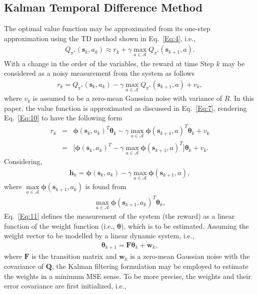 \documentclass{ieeeaccess}
\def\mA{\mathcal{A}}
\def\k{_{k}}
\def\nk{_{k+1}}
\def\bt{\bm{\theta}}
\def\h{\bm{h}}
\def\Q{\bm{Q}}
\def\F{\bm{F}}
\def\w{\bm{w}}
\def\s{\bm{s}}
\begin{document}
\subsection{Kalman Temporal Difference Method}
The optimal value function may be approximated from its one-step approximation using the TD method shown in Eq.~\eqref{Eq:4}, i.e.,
%
\begin{eqnarray}
Q_{\pi^*}(\s\k, a\k) \approx r\k +\gamma \max_{a\in \mA} Q_{\pi^*}(\s\nk, a).
\end{eqnarray}
%
With a change in the order of the variables, the reward at time Step $k$ may be considered as a noisy measurement from the system as follows
%
\begin{eqnarray}
r\k = Q_{\pi^*}(\s\k, a\k) -\gamma \max_{a\in \mA} Q_{\pi^*}(\s\nk, a) + v\k, \label{Eq:10}
\end{eqnarray}
%
where $v\k$ is assumed to be a zero-mean Gaussian noise with variance of $R$. In this paper, the value function is approximated as discussed in Eq.~\eqref{Eq:7}, rendering Eq.~\eqref{Eq:10} to have the
following form
%
\begin{eqnarray}
r\k &\!\!=\!\!& \bm{\phi}(\s\k, a\k)^T \bt\k \!-\! \gamma \max_{a \in\mA}\bm{\phi}(\s\nk, a)^T \bt\k +v\k \nonumber \\
&\!\!=\!\!& \Big[\bm{\phi}(\s\k, a\k)^T\!-\! \gamma \max_{a \in\mA}\bm{\phi}(\s\nk, a)^T\Big]\bt\k+v\k.\label{Eq:11}
\end{eqnarray}
%
Considering,
%
\begin{eqnarray}
\h\k = \bm{\phi}(\s\k, a\k) - \gamma \max_{a \in \mA} \bm{\phi}(\s\nk, a), \label{Eq:12n}
\end{eqnarray}
%
where $\max\limits_{a \in\mA} \bm{\phi}(\s\nk, a\k)$ is found from
%
\begin{eqnarray}
 \max\limits_{a \in \mA} \bm{\phi}(\s\nk, a\k)^T\bt\k,\nonumber
\end{eqnarray}
%
Eq.~\eqref{Eq:11} defines the measurement of the system (the reward) as a linear function of the weight function (i.e., $\bt$), which is to be estimated. Assuming the weight vector to be modelled by a linear dynamic system, i.e.,
%
\begin{eqnarray}
\bt\nk = \F\bt\k + \w\k, \label{Eq:13n}
\end{eqnarray}
%
where $\F$ is the transition matrix and $\w\k$ is a zero-mean Gaussian noise with the covariance of $\Q$, the Kalman filtering formulation may be employed to estimate the weights in a minimum MSE sense. To be more precise, the weights and their error covariance are first initialized, i.e.,
\end{document}
